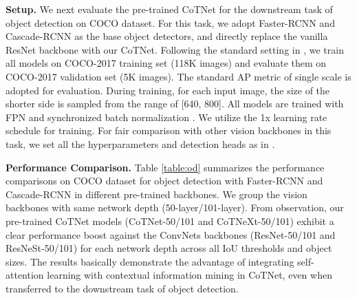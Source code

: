 \documentclass[10pt,twocolumn,letterpaper]{article}
\begin{document}
\textbf{Setup.} We next evaluate the pre-trained CoTNet for the downstream task of object detection on COCO dataset. For this task, we adopt Faster-RCNN \cite{ren2016faster,ren2015faster} and Cascade-RCNN \cite{cai2018cascade} as the base object detectors, and directly replace the vanilla ResNet backbone with our CoTNet. Following the standard setting in \cite{xie2017aggregated}, we train all models on COCO-2017 training set (118K images) and evaluate them on COCO-2017 validation set (5K images). The standard AP metric of single scale is adopted for evaluation. During training, for each input image, the size of the shorter side is sampled from the range of [640, 800]. All models are trained with FPN \cite{lin2017feature} and synchronized batch normalization \cite{zhang2018context}. We utilize the 1x learning rate schedule for training. For fair comparison with other vision backbones in this task, we set all the hyperparameters and detection heads as in \cite{zhang2020resnest}.

\textbf{Performance Comparison.} Table \ref{table:od} summarizes the performance comparisons on COCO dataset for object detection with Faster-RCNN and Cascade-RCNN in different pre-trained backbones. We group the vision backbones with same network depth (50-layer/101-layer). From observation, our pre-trained CoTNet models (CoTNet-50/101 and CoTNeXt-50/101) exhibit a clear performance boost against the ConvNets backbones (ResNet-50/101 and ResNeSt-50/101) for each network depth across all IoU thresholds and object sizes. The results basically demonstrate the advantage of integrating self-attention learning with contextual information mining in CoTNet, even when transferred to the downstream task of object detection.
\end{document}
